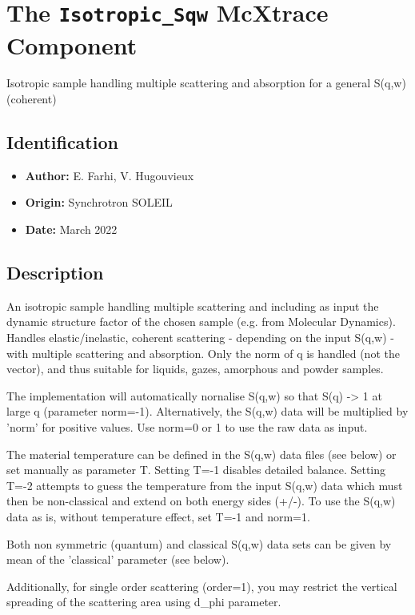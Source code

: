 \section{The \texttt{Isotropic\_Sqw} McXtrace Component}
Isotropic sample handling multiple scattering and absorption for a general
S(q,w) (coherent)

\subsection*{Identification}
\begin{itemize}
  \item \textbf{Author:} E. Farhi, V. Hugouvieux
  \item \textbf{Origin:} Synchrotron SOLEIL
  \item \textbf{Date:} March 2022
\end{itemize}

\subsection*{Description}
An isotropic sample handling multiple scattering and including as input the dynamic structure factor of the chosen sample (e.g. from Molecular Dynamics). Handles elastic/inelastic, coherent scattering - depending on the input S(q,w) - with multiple scattering and absorption. Only the norm of q is handled (not the vector), and thus suitable for liquids, gazes, amorphous and powder samples.

The implementation will automatically nornalise S(q,w) so that S(q) -\textgreater{} 1 at large q (parameter norm=-1). Alternatively, the S(q,w) data will be multiplied by 'norm' for positive values. Use norm=0 or 1 to use the raw data as input.

The material temperature can be defined in the S(q,w) data files (see below) or set manually as parameter T. Setting T=-1 disables detailed balance. Setting T=-2 attempts to guess the temperature from the input S(q,w) data which must then be non-classical and extend on both energy sides (+/-). To use the S(q,w) data as is, without temperature effect, set T=-1 and norm=1.

Both non symmetric (quantum) and classical S(q,w) data sets can be given by mean of the 'classical' parameter (see below).

Additionally, for single order scattering (order=1), you may restrict the vertical spreading of the scattering area using d\_phi parameter.

